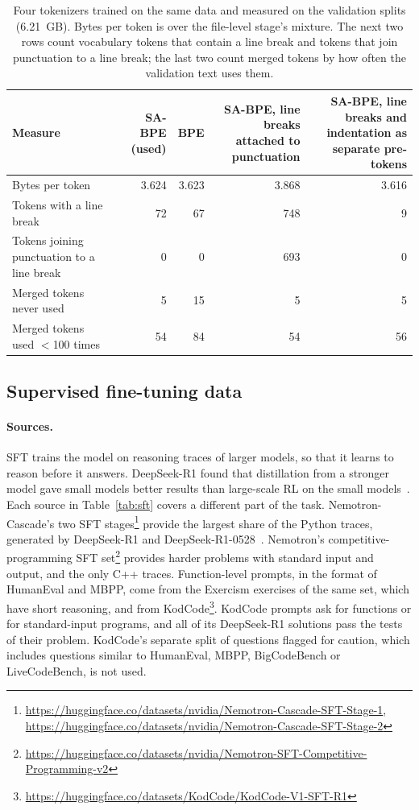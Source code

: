 \documentclass[sigconf,nonacm,balance=false]{acmart}
\begin{document}
\begin{table}
  \caption{Four tokenizers trained on the same data and measured on the validation splits (6.21~GB). Bytes per token
  is over the file-level stage's mixture. The next two rows count vocabulary tokens that contain a line break and
  tokens that join punctuation to a line break; the last two count merged tokens by how often the validation text
  uses them.}
  \label{tab:tokenizers}
  \small
  \begin{tabular}{lrrrr}
    \toprule
    Measure & SA-BPE (used) & BPE & \shortstack[r]{SA-BPE, line breaks\\attached to punctuation} &
      \shortstack[r]{SA-BPE, line breaks and\\indentation as separate pre-tokens} \\
    \midrule
    Bytes per token & 3.624 & 3.623 & 3.868 & 3.616 \\
    Tokens with a line break & 72 & 67 & 748 & 9 \\
    Tokens joining punctuation to a line break & 0 & 0 & 693 & 0 \\
    Merged tokens never used & 5 & 15 & 5 & 5 \\
    Merged tokens used $<$100 times & 54 & 84 & 54 & 56 \\
    \bottomrule
  \end{tabular}
\end{table}

\subsection{Supervised fine-tuning data}
\label{sec:data-sft}

\paragraph{Sources.} SFT trains the model on reasoning traces of larger models, so that it learns to reason before it
answers. DeepSeek-R1 found that distillation from a stronger model gave small models better results than large-scale
RL on the small models~\cite{deepseek2025r1}. Each source in Table~\ref{tab:sft} covers a different part of the task.
Nemotron-Cascade's two SFT stages\footnote{\url{https://huggingface.co/datasets/nvidia/Nemotron-Cascade-SFT-Stage-1},
\url{https://huggingface.co/datasets/nvidia/Nemotron-Cascade-SFT-Stage-2}} provide the largest share of the Python
traces, generated by DeepSeek-R1 and DeepSeek-R1-0528~\cite{wang2025nemotroncascade}. Nemotron's
competitive-programming SFT set\footnote{\url{https://huggingface.co/datasets/nvidia/Nemotron-SFT-Competitive-Programming-v2}}
provides harder problems with standard input and output, and the only C++ traces. Function-level prompts, in the
format of HumanEval and MBPP, come from the Exercism exercises of the same set, which have short reasoning, and from
KodCode\footnote{\url{https://huggingface.co/datasets/KodCode/KodCode-V1-SFT-R1}}.
KodCode prompts ask for functions or for standard-input programs, and all of its DeepSeek-R1 solutions pass the tests
of their problem. KodCode's separate split of questions flagged for caution, which includes questions similar to
HumanEval, MBPP, BigCodeBench or LiveCodeBench, is not used.
\end{document}
